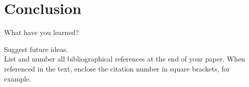 \documentclass[10pt,twocolumn,letterpaper]{article}
\begin{document}
\section{Conclusion}
What have you learned? 

Suggest future ideas.\\

List and number all bibliographical references at the end of your paper. When referenced in the text,
enclose the citation number in square brackets, for
example. \\


\cite{slavkovikj2014image}
\cite{patterson2014sun}
\cite{rundle2011using}
\cite{zhou2017places}
\cite{DBLP:journals/corr/ZhouKLOT14}
\cite{DBLP:journals/corr/Wang15l}
\cite{DBLP:journals/corr/HeZRS15}
\cite{DBLP:journals/corr/ZagoruykoK16}
\cite{DBLP:journals/corr/ZhouKLTO16}

{\small


}
\end{document}
